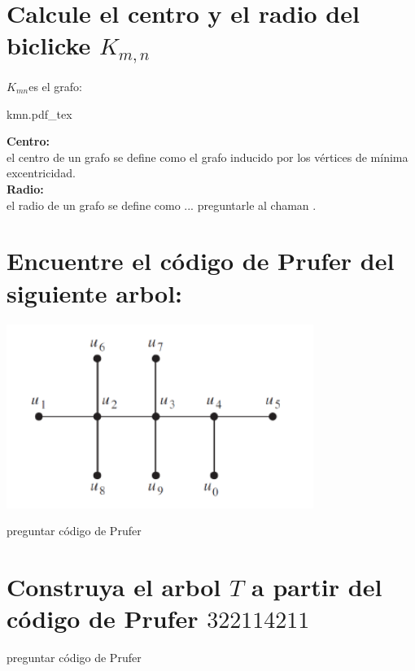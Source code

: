 \documentclass[10pt,a4paper]{article} %
\newcommand{\incfig}[1]{%
    \def\svgwidth{\columnwidth}
    {#1.pdf_tex}
}
\begin{document}


    \section{Calcule el centro y el radio del biclicke $K_{m,n}$}
        $K_{mn} $es el grafo:
            \begin{center}
            \incfig{kmn}%
            \end{center}

            \textbf{Centro:}
            \\
            el centro de un grafo se define como el grafo inducido por los
            vértices de mínima excentricidad.
            \\
            \textbf{Radio:}
            \\
            el radio de un grafo se define como ... \color{red} preguntarle al
            chaman \color{black}.




    \section{Encuentre el código de Prufer del siguiente arbol:}
        \begin{center}
            \includegraphics[width=0.4\linewidth]{arbolp4}
        \end{center}
        \color{red} preguntar código de Prufer  \color{black}




    \section{Construya el arbol $T$ a partir del código de Prufer $322114211$}
        \color{red} preguntar código de Prufer  \color{black}
\end{document}

